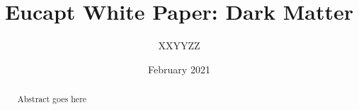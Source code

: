 \documentclass{article}
\title{Eucapt White Paper: Dark Matter}
\author{XXYYZZ}
\date{February 2021}
\begin{document}
\maketitle
\begin{abstract}
    Abstract goes here
\end{abstract}


\tableofcontents








\end{document}
